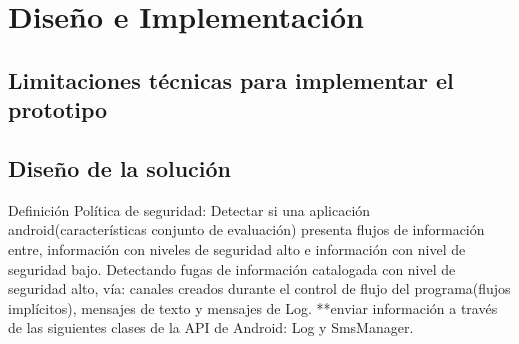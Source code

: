 \label{ch:desing}
\chapter{Diseño e Implementación}

\section{Limitaciones técnicas para implementar el prototipo}

\section{Diseño de la solución} 
Definición Política de seguridad:\newline
Detectar si una aplicación android(características conjunto de evaluación)
presenta flujos de información entre, información con niveles de seguridad alto
e información con nivel de seguridad bajo.\newline 
Detectando fugas de información catalogada con nivel de seguridad alto, vía:
canales creados durante el control de flujo del programa(flujos implícitos),
mensajes de texto y mensajes de Log. \newline 
**enviar información a través de las siguientes clases de la
API de Android: Log y SmsManager.\newline



